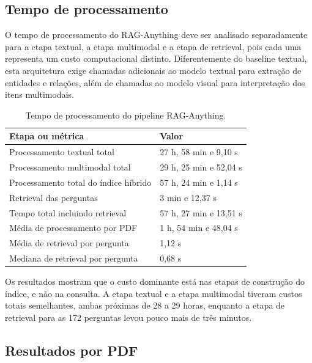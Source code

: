 \subsection{Tempo de processamento}
\label{subsec:raganything-tempo-processamento}

O tempo de processamento do RAG-Anything deve ser analisado separadamente para a etapa textual, a etapa multimodal e a etapa de retrieval, pois cada uma representa um custo computacional distinto. Diferentemente do baseline textual, esta arquitetura exige chamadas adicionais ao modelo textual para extração de entidades e relações, além de chamadas ao modelo visual para interpretação dos itens multimodais.

\begin{table}[htbp]
\centering
\caption{Tempo de processamento do pipeline RAG-Anything.}
\label{tab:tempo-raganything}
\small
\begin{tabular}{p{7.6cm}p{4.8cm}}
\toprule
\textbf{Etapa ou métrica} & \textbf{Valor} \\
\midrule
Processamento textual total & 27 h, 58 min e 9,10 s \\
\addlinespace
Processamento multimodal total & 29 h, 25 min e 52,04 s \\
\addlinespace
Processamento total do índice híbrido & 57 h, 24 min e 1,14 s \\
\addlinespace
Retrieval das perguntas & 3 min e 12,37 s \\
\addlinespace
Tempo total incluindo retrieval & 57 h, 27 min e 13,51 s \\
\addlinespace
Média de processamento por PDF & 1 h, 54 min e 48,04 s \\
Média de retrieval por pergunta & 1,12 s \\
Mediana de retrieval por pergunta & 0,68 s \\
\bottomrule
\end{tabular}
\end{table}

Os resultados mostram que o custo dominante está nas etapas de construção do índice, e não na consulta. A etapa textual e a etapa multimodal tiveram custos totais semelhantes, ambas próximas de 28 a 29 horas, enquanto a etapa de retrieval para as 172 perguntas levou pouco mais de três minutos.

\subsection{Resultados por PDF}
\label{subsec:raganything-resultados-pdf}

